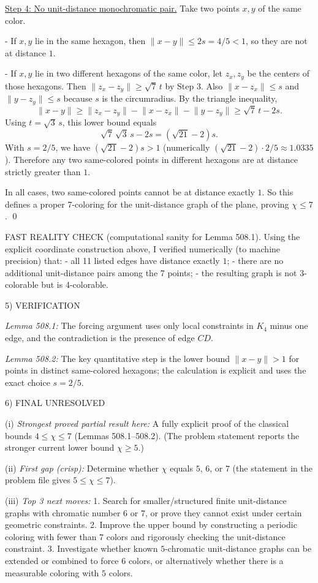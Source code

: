 \underline{Step 4: No unit-distance monochromatic pair.}
Take two points $x,y$ of the same color.

- If $x,y$ lie in the same hexagon, then $\lVert x-y\rVert\le 2s=4/5<1$, so they are not at distance $1$.

- If $x,y$ lie in two different hexagons of the same color, let $z_x,z_y$ be the centers of those hexagons.
Then $\lVert z_x-z_y\rVert\ge \sqrt7\,t$ by Step 3.
Also $\lVert x-z_x\rVert\le s$ and $\lVert y-z_y\rVert\le s$ because $s$ is the circumradius.
By the triangle inequality,
\[
\lVert x-y\rVert\ge \lVert z_x-z_y\rVert - \lVert x-z_x\rVert - \lVert y-z_y\rVert \ge \sqrt7\,t -2s.
\]
Using $t=\sqrt3\,s$, this lower bound equals
\[\sqrt7\,\sqrt3\,s-2s = (\sqrt{21}-2)s.
\]
With $s=2/5$, we have $(\sqrt{21}-2)s>1$ (numerically $(\sqrt{21}-2)\cdot 2/5\approx 1.0335$).
Therefore any two same-colored points in different hexagons are at distance strictly greater than $1$.

In all cases, two same-colored points cannot be at distance exactly $1$.
So this defines a proper 7-coloring for the unit-distance graph of the plane, proving $\chi\le 7$.
\qed

FAST REALITY CHECK (computational sanity for Lemma 508.1).
Using the explicit coordinate construction above, I verified numerically (to machine precision) that:
- all 11 listed edges have distance exactly $1$;
- there are no additional unit-distance pairs among the 7 points;
- the resulting graph is not 3-colorable but is 4-colorable.

5) VERIFICATION

\emph{Lemma 508.1:} The forcing argument uses only local constraints in $K_4$ minus one edge, and the contradiction is the presence of edge $CD$.

\emph{Lemma 508.2:} The key quantitative step is the lower bound $\lVert x-y\rVert>1$ for points in distinct same-colored hexagons; the calculation is explicit and uses the exact choice $s=2/5$.

6) FINAL
UNRESOLVED

(i) \emph{Strongest proved partial result here:} A fully explicit proof of the classical bounds $4\le \chi\le 7$ (Lemmas 508.1--508.2). (The problem statement reports the stronger current lower bound $\chi\ge 5$.)

(ii) \emph{First gap (crisp):} Determine whether $\chi$ equals $5$, $6$, or $7$ (the statement in the problem file gives $5\le \chi\le 7$).

(iii) \emph{Top 3 next moves:}
1. Search for smaller/structured finite unit-distance graphs with chromatic number $6$ or $7$, or prove they cannot exist under certain geometric constraints.
2. Improve the upper bound by constructing a periodic coloring with fewer than $7$ colors and rigorously checking the unit-distance constraint.
3. Investigate whether known $5$-chromatic unit-distance graphs can be extended or combined to force $6$ colors, or alternatively whether there is a measurable coloring with $5$ colors.

